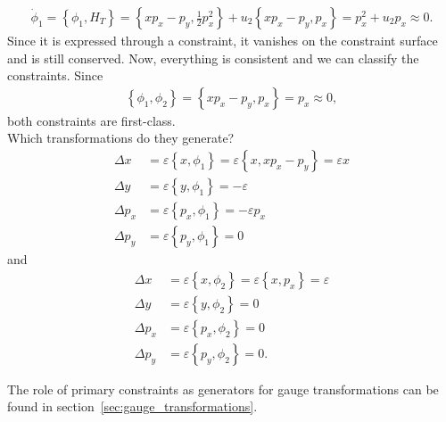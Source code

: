 \begin{solution}
\begin{align*}
\dot{\phi}_1 = \left \{ \phi_1,H_T \right \} = \left \{ x p_x - p_y,\frac{1}{2} p_x^2 \right \} + u_2 \left \{ x p_x - p_y,p_x \right \} = p_x^2 + u_2 p_x \approx 0.
\end{align*}
Since it is expressed through a constraint, it vanishes on the constraint surface and is still conserved. Now, everything is consistent and we can classify the constraints. Since
\begin{align*}
\left \{ \phi_1,\phi_2 \right \} = \left \{ x p_x - p_y,p_x \right \} = p_x \approx 0,
\end{align*}
both constraints are first-class. \\
Which transformations do they generate?
\begin{align*}
\Delta x &= \varepsilon \left \{ x,\phi_1 \right \} = \varepsilon \left \{ x,x p_x - p_y \right \} = \varepsilon x \\
\Delta y &= \varepsilon \left \{ y,\phi_1 \right \} = - \varepsilon \\
\Delta p_x &= \varepsilon \left \{ p_x,\phi_1 \right \} = - \varepsilon p_x \\
\Delta p_y &= \varepsilon \left \{ p_y,\phi_1 \right \} = 0
\end{align*}
and 
\begin{align*}
\Delta x &= \varepsilon \left \{ x,\phi_2 \right \} = \varepsilon \left \{ x,p_x \right \} = \varepsilon \\
\Delta y &= \varepsilon \left \{ y,\phi_2 \right \} = 0 \\
\Delta p_x &= \varepsilon \left \{ p_x,\phi_2 \right \} = 0 \\
\Delta p_y &= \varepsilon \left \{ p_y,\phi_2 \right \} = 0.
\end{align*}

The role of primary constraints as generators for gauge transformations can be found in section~\vref{sec:gauge_transformations}.
\end{solution}



